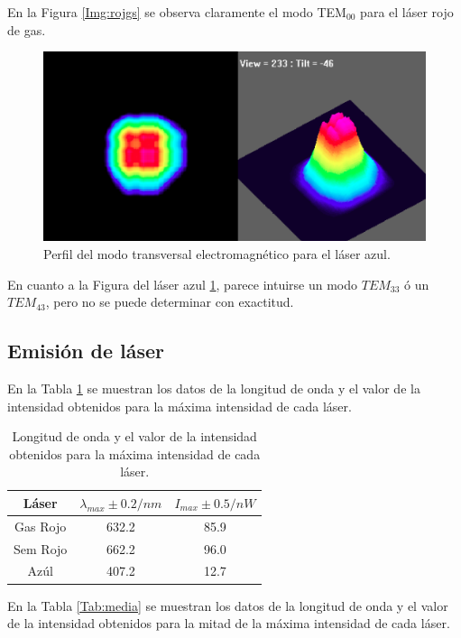\documentclass[twoside]{article}
\begin{document}
\begin{multicols}{2}
				En la Figura \ref{Img:rojgs} se observa claramente el modo TEM$_{00}$ para el láser rojo de gas.

					\begin{figure}[H]
						\centering
						\includegraphics[scale=0.38]{azul.png}
						\caption{\label{Img:azul}Perfil del modo transversal electromagnético para el láser azul.}
					\end{figure}

				En cuanto a la Figura del láser azul \ref{Img:azul}, parece intuirse un modo $TEM_{33}$ ó un $TEM_{43}$, pero no se puede determinar con exactitud.

			\subsection{Emisión de láser}

				En la Tabla \ref{Tab:Max} se muestran los datos de la longitud de onda y el valor de la intensidad obtenidos para la máxima intensidad de cada láser.

					\begin{table}[H]
						\centering
						\begin{tabular}{c c c}
							\hline
							\centering
								Láser & $\lambda_{max} \pm 0.2 /nm$ & $I_{max} \pm 0.5 /nW$ \\ \hline
								Gas Rojo & 632.2 & 85.9 \\
								Sem Rojo & 662.2 & 96.0 \\
								Azúl & 407.2 & 12.7 \\ \hline
						\end{tabular}
						\caption{\label{Tab:Max}Longitud de onda y el valor de la intensidad obtenidos para la máxima intensidad de cada láser.}
					\end{table}

				En la Tabla \ref{Tab:media} se muestran los datos de la longitud de onda y el valor de la intensidad obtenidos para la mitad de la máxima intensidad de cada láser.


\end{multicols}
\end{document}

